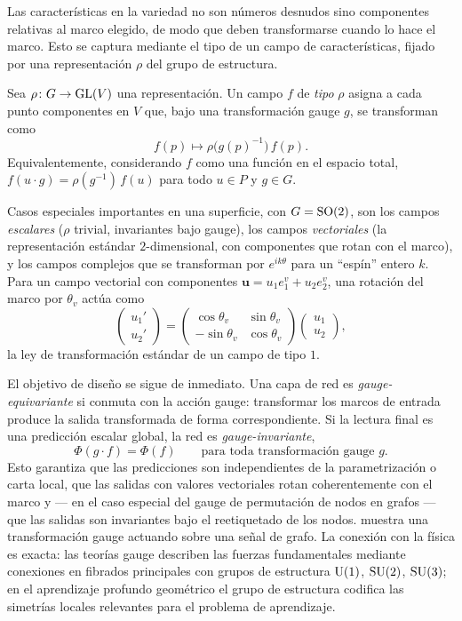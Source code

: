 Las caracter\'isticas en la variedad no son n\'umeros desnudos sino componentes
relativas al marco elegido, de modo que deben transformarse cuando lo hace el
marco. Esto se captura mediante el tipo de un campo de caracter\'isticas, fijado
por una representaci\'on $\rho$ del grupo de estructura.

\begin{definition}
\label{def:gauge:field}
Sea $\rho\colon G \to \operatorname{GL}(V)$ una representaci\'on. Un campo $f$ de \emph{tipo}
$\rho$ asigna a cada punto componentes en $V$ que, bajo una transformaci\'on
gauge $g$, se transforman como
\[
  f(p) \longmapsto \rho\big(g(p)^{-1}\big)\, f(p).
\]
Equivalentemente, considerando $f$ como una funci\'on en el espacio total,
$f(u \cdot g) = \rho(g^{-1})\, f(u)$ para todo $u \in P$ y $g \in G$.
\end{definition}

Casos especiales importantes en una superficie, con $G = \operatorname{SO}(2)$, son los campos
\emph{escalares} ($\rho$ trivial, invariantes bajo gauge), los campos
\emph{vectoriales} (la representaci\'on est\'andar $2$-dimensional, con
componentes que rotan con el marco), y los campos complejos que se transforman
por $e^{i k\theta}$ para un ``esp\'in'' entero $k$. Para un campo vectorial con
componentes $\mathbf{u} = u_1 e_1^v + u_2 e_2^v$, una rotaci\'on del marco por
$\theta_v$ act\'ua como
\[
  \begin{pmatrix} u_1' \\ u_2' \end{pmatrix} =
  \begin{pmatrix} \cos\theta_v & \sin\theta_v \\ -\sin\theta_v & \cos\theta_v
  \end{pmatrix}
  \begin{pmatrix} u_1 \\ u_2 \end{pmatrix},
\]
la ley de transformaci\'on est\'andar de un campo de tipo $1$.

El objetivo de dise\~no se sigue de inmediato. Una capa de red es
\emph{gauge-equivariante} si conmuta con la acci\'on gauge: transformar los
marcos de entrada produce la salida transformada de forma correspondiente. Si la
lectura final es una predicci\'on escalar global, la red es \emph{gauge-invariante},
\[
  \Phi(g \cdot f) = \Phi(f) \qquad \text{para toda transformaci\'on gauge } g.
\]
Esto garantiza que las predicciones son independientes de la parametrizaci\'on o
carta local, que las salidas con valores vectoriales rotan coherentemente con el
marco y --- en el caso especial del gauge de permutaci\'on de nodos en grafos ---
que las salidas son invariantes bajo el reetiquetado de los nodos.
 muestra una transformaci\'on gauge actuando sobre
una se\~nal de grafo. La conexi\'on con la f\'isica es exacta: las teor\'ias gauge
describen las fuerzas fundamentales mediante conexiones en fibrados principales
con grupos de estructura $\operatorname{U}(1)$, $\operatorname{SU}(2)$, $\operatorname{SU}(3)$; en el aprendizaje profundo
geom\'etrico el grupo de estructura codifica las simetr\'ias locales relevantes
para el problema de aprendizaje.


